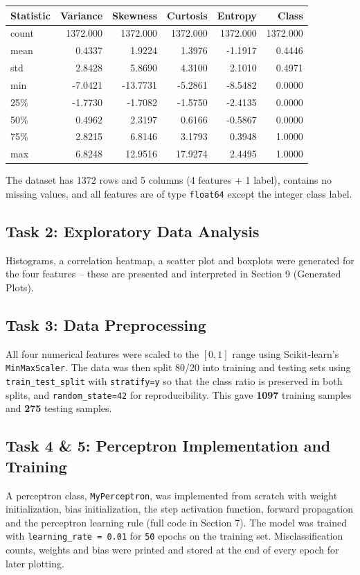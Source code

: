 \documentclass[11pt]{article}
\begin{document}
\begin{center}
\small
\begin{tabular}{|l|r|r|r|r|r|}
\hline
\textbf{Statistic} & \textbf{Variance} & \textbf{Skewness} & \textbf{Curtosis} & \textbf{Entropy} & \textbf{Class}\\
\hline
count & 1372.000 & 1372.000 & 1372.000 & 1372.000 & 1372.000\\
mean  & 0.4337   & 1.9224   & 1.3976   & -1.1917  & 0.4446\\
std   & 2.8428   & 5.8690   & 4.3100   & 2.1010   & 0.4971\\
min   & -7.0421  & -13.7731 & -5.2861  & -8.5482  & 0.0000\\
25\%  & -1.7730  & -1.7082  & -1.5750  & -2.4135  & 0.0000\\
50\%  & 0.4962   & 2.3197   & 0.6166   & -0.5867  & 0.0000\\
75\%  & 2.8215   & 6.8146   & 3.1793   & 0.3948   & 1.0000\\
max   & 6.8248   & 12.9516  & 17.9274  & 2.4495   & 1.0000\\
\hline
\end{tabular}
\end{center}

The dataset has 1372 rows and 5 columns (4 features + 1 label), contains no missing values, and all features are of type \texttt{float64} except the integer class label.

\subsection*{Task 2: Exploratory Data Analysis}
Histograms, a correlation heatmap, a scatter plot and boxplots were generated for the four features -- these are presented and interpreted in Section 9 (Generated Plots).

\subsection*{Task 3: Data Preprocessing}
All four numerical features were scaled to the $[0,1]$ range using Scikit-learn's \texttt{MinMaxScaler}. The data was then split 80/20 into training and testing sets using \texttt{train\_test\_split} with \texttt{stratify=y} so that the class ratio is preserved in both splits, and \texttt{random\_state=42} for reproducibility. This gave \textbf{1097} training samples and \textbf{275} testing samples.

\subsection*{Task 4 \& 5: Perceptron Implementation and Training}
A perceptron class, \texttt{MyPerceptron}, was implemented from scratch with weight initialization, bias initialization, the step activation function, forward propagation and the perceptron learning rule (full code in Section 7). The model was trained with \texttt{learning\_rate = 0.01} for \texttt{50} epochs on the training set. Misclassification counts, weights and bias were printed and stored at the end of every epoch for later plotting.
\end{document}
